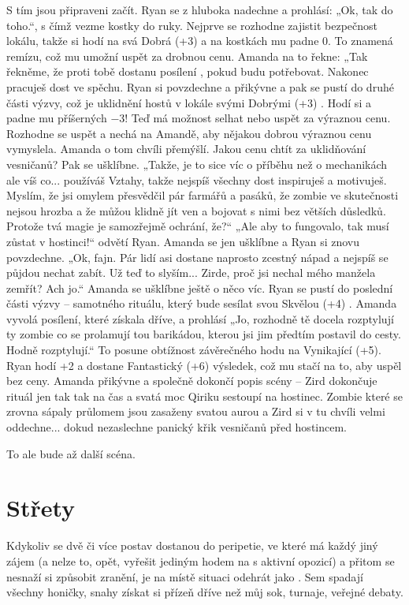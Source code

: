 \documentclass[../main.tex]{subfiles}
\begin{document}
S tím jsou připraveni začít. Ryan se z hluboka nadechne a prohlásí: „Ok, tak do toho.“, s
čímž vezme kostky do ruky. Nejprve se rozhodne zajistit bezpečnost lokálu, takže si hodí
na svá Dobrá (+3)  a na kostkách mu padne 0. To znamená remízu, což mu
umožní uspět za drobnou cenu. Amanda na to řekne: „Tak řekněme, že proti tobě dostanu
posílení , pokud budu potřebovat. Nakonec pracuješ dost ve spěchu. Ryan
si povzdechne a přikývne a pak se pustí do druhé části výzvy, což je uklidnění hostů v
lokále svými Dobrými (+3) . Hodí si a padne mu příšerných −3! Teď má možnost
selhat nebo uspět za výraznou cenu. Rozhodne se uspět a nechá na Amandě, aby nějakou
dobrou výraznou cenu vymyslela. Amanda o tom chvíli přemýšlí. Jakou cenu chtít za
uklidňování vesničanů? Pak se ušklíbne. „Takže, je to sice víc o příběhu než o
mechanikách ale víš co... používáš Vztahy, takže nejspíš všechny dost inspiruješ a
motivuješ. Myslím, že jsi omylem přesvědčil pár farmářů a pasáků, že zombie ve
skutečnosti nejsou hrozba a že můžou klidně jít ven a bojovat s nimi bez větších
důsledků. Protože tvá magie je samozřejmě ochrání, že?“ „Ale aby to fungovalo, tak musí
zůstat v hostinci!“ odvětí Ryan. Amanda se jen ušklíbne a Ryan si znovu povzdechne. „Ok,
fajn. Pár lidí asi dostane naprosto zcestný nápad a nejspíš se půjdou nechat zabít. Už
teď to slyším... Zirde, proč jsi nechal mého manžela zemřít? Ach jo.“ Amanda se ušklíbne
ještě o něco víc. Ryan se pustí do poslední části výzvy – samotného rituálu, který bude
sesílat svou Skvělou (+4) . Amanda vyvolá posílení, které získala dříve, a
prohlásí „Jo, rozhodně tě docela rozptylují ty zombie co se prolamují tou barikádou,
kterou jsi jim předtím postavil do cesty. Hodně rozptylují.“ To posune obtížnost
závěrečného hodu na Vynikající (+5). Ryan hodí +2 a dostane Fantastický (+6) výsledek,
což mu stačí na to, aby uspěl bez ceny. Amanda přikývne a společně dokončí popis scény –
Zird dokončuje rituál jen tak tak na čas a svatá moc Qiriku sestoupí na hostinec. Zombie
které se zrovna sápaly průlomem jsou zasaženy svatou aurou a Zird si v tu chvíli velmi
oddechne... dokud nezaslechne panický křik vesničanů před hostincem.

To ale bude až další scéna.

\section{Střety}
\label{sec:strety}

Kdykoliv se dvě či více postav dostanou do peripetie, ve které má každý jiný zájem (a
nelze to, opět, vyřešit jediným hodem na  s aktivní opozicí) a přitom se
nesnaží si způsobit zranění, je na místě situaci odehrát jako . Sem spadají
všechny honičky, snahy získat si přízeň dříve než můj sok, turnaje, veřejné debaty.
\end{document}
